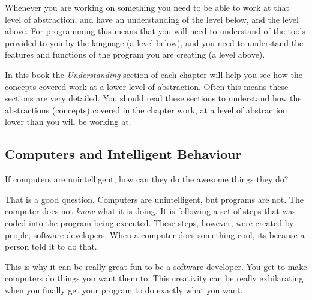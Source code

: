 Whenever you are working on something you need to be able to work at that level of abstraction, and have an understanding of the level below, and the level above. For programming this means that you will need to understand of the tools provided to you by the language (a level below), and you need to understand the features and functions of the program you are creating (a level above).

In this book the \emph{Understanding} section of each chapter will help you see how the concepts covered work at a lower level of abstraction. Often this means these sections are very detailed. You should read these sections to understand how the abstractions (concepts) covered in the chapter work, at a level of abstraction lower than you will be working at.

\clearpage
\subsection{Computers and Intelligent Behaviour} %
\label{sub:computers_and_intelligent_behaviour}

If computers are unintelligent, how can they do the awesome things they do?

That is a good question. Computers are unintelligent, but programs are not. The computer does not \emph{know} what it is doing. It is following a set of steps that was coded into the program being executed. These steps, however, were created by people, software developers. When a computer does something cool, its because a person told it to do that.

This is why it can be really great fun to be a software developer. You get to make computers do things you want them to. This creativity can be really exhilarating when you finally get your program to do exactly what you want.

